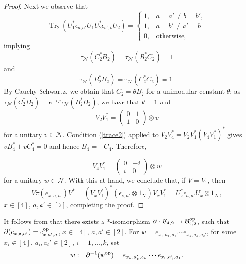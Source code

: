 \documentclass[11pt]{amsart}
\theoremstyle{definition}
\newcommand{\cl}[1]{\mathcal{#1}}
\newcommand{\bb}[1]{\mathbb{#1}}
\DeclareMathOperator{\Tr}{Tr}
\begin{document}
\begin{proof}
Next we observe that 
$$\Tr_2(U_1^*\epsilon_{a,a'}U_1U_2^*\epsilon_{b',b}U_2)=\left\{\begin{array}{ll}1, & a=a'\ne b=b',\\
1, & a=b'\ne a'=b\\
0,& \text{otherwise,}\end{array}\right.$$
implying $$\tau_{\cl N}(C_{2}^*B_{2})=\tau_{\cl N}(B_{2}^*C_{2})=1$$ and $$\tau_{\cl N}(B_{2}^*B_{2})=\tau_{\cl N}(C_{2}^*C_{2})=1.$$ By Cauchy-Schwartz, we obtain that $C_{2} = \theta B_{2}$ for a unimodular constant $\theta$; 
as $\tau_{\cl N}(C_{2}^*B_{2})=e^{-i\varphi}\tau_{\cl N}(B_{2}^*B_{2})$, we have that $\theta = 1$ and
$$V_{2}V_{1}^*=\left(\begin{array}{cc}0&1\\1&0\end{array}\right)\otimes v$$
for a unitary $v\in\cl N$. 
Condition (\ref{trace2}) applied to $V_{2}V_{4}^*=V_{2}V_{1}^*(V_{4}V_{1}^*)^*$ gives $vB_{4}^*+vC_{4}^*=0$ and hence $B_{4}=-C_{4}$. Therefore, 

$$V_{4}V_{1}^*=\left(\begin{array}{cc}0&-i\\i&0\end{array}\right)\otimes w$$
for a unitary $w\in\cl N$. 
With this at hand, we conclude that, if  
$V = V_{1}$, then 
$$V\pi(e_{x,a,a'})V^*=(V_{x}V_{1}^*)^*(\epsilon_{a,a'}\otimes 1_{\cl N})V_{x}V_{1}^*=U_x^*\epsilon_{a,a'}U_x\otimes 1_{\cl N},$$
$x\in [4]$, $a,a' \in [2]$, 
completing the proof. 
\end{proof}


It follows from \cite[Lemma 9.2]{tt-QNS} that there 
exists a *-isomorphism $\partial: \cl B_{4,2}\to\cl B_{4,2}^{\rm op}$, such that 
$\partial(e_{x,a,a'}) = e_{x,a',a}^{\rm op}$, 
$x\in [4]$, $a,a'\in [2]$. 
For
$w = e_{x_1,a_1,a_1'}\cdots e_{x_k,a_k,a_k'}$, for some $x_i\in [4]$, $a_i,a_i'\in [2]$, 
$i = 1,\dots,k$,
set 
$$\bar{w}:= \partial^{-1}(w^{\rm op}) = e_{x_k,a_k',a_k}\cdots e_{x_1,a_1',a_1}.$$
\end{document}
